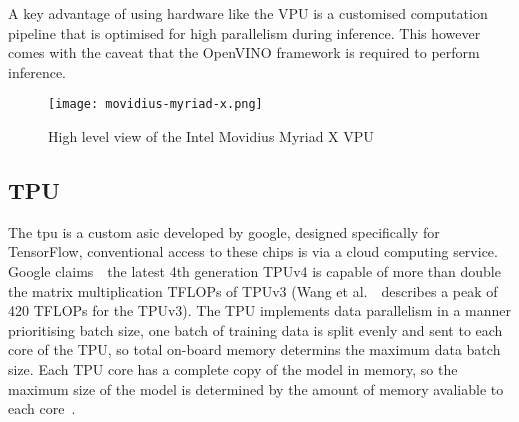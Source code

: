 \documentclass[../../D1.tex]{subfiles}
\begin{document}
A key advantage of using hardware like the VPU is a customised computation pipeline that is optimised for high parallelism during inference. This however comes with the caveat that the OpenVINO framework is required to perform inference\autocite{antoniniResourceCharacterisationPersonalScale2019}.

\begin{figure}
    \texttt{[image: movidius-myriad-x.png]}
    \caption{High level view of the Intel Movidius Myriad X VPU}
    \label{fig:MyriadX}
\end{figure}

\subsection{TPU}
The \acrshort{tpu} is a custom \acrshort{asic} developed by google, designed specifically for TensorFlow, conventional access to these chips is via a cloud computing service. 
Google claims~\autocite{GoogleWinsMLPerf}~the latest 4th generation TPUv4 is capable of more than double the matrix multiplication TFLOPs of TPUv3 (Wang et al.~\autocite{wangBenchmarkingTPUGPU2019}~describes a peak of 420 TFLOPs for the TPUv3).
The TPU implements data parallelism in a manner prioritising batch size, one batch of training data is split evenly and sent to each core of the TPU, so total on-board memory determins the maximum data batch size.
Each TPU core has a complete copy of the model in memory, so the maximum size of the model is determined by the amount of memory avaliable to each core~\autocite{wangBenchmarkingTPUGPU2019}.
\end{document}
